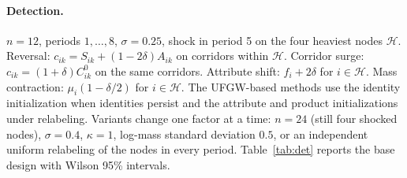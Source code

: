 \documentclass[12pt]{article}
\begin{document}
\paragraph{Detection.} $n=12$, periods $1,\dots,8$, $\sigma=0.25$, shock in period 5 on the four heaviest nodes $\mathcal H$. Reversal: $c_{ik}=S_{ik}+(1-2\delta)A_{ik}$ on corridors within $\mathcal H$. Corridor surge: $c_{ik}=(1+\delta)C^0_{ik}$ on the same corridors. Attribute shift: $f_i+2\delta$ for $i\in\mathcal H$. Mass contraction: $\mu_i(1-\delta/2)$ for $i\in\mathcal H$. The UFGW-based methods use the identity initialization when identities persist and the attribute and product initializations under relabeling. Variants change one factor at a time: $n=24$ (still four shocked nodes), $\sigma=0.4$, $\kappa=1$, log-mass standard deviation $0.5$, or an independent uniform relabeling of the nodes in every period. Table~\ref{tab:det} reports the base design with Wilson 95\% intervals.
\end{document}
